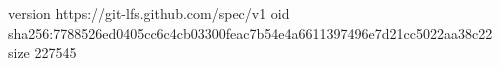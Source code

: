 version https://git-lfs.github.com/spec/v1
oid sha256:7788526ed0405cc6c4cb03300feac7b54e4a6611397496e7d21cc5022aa38c22
size 227545
